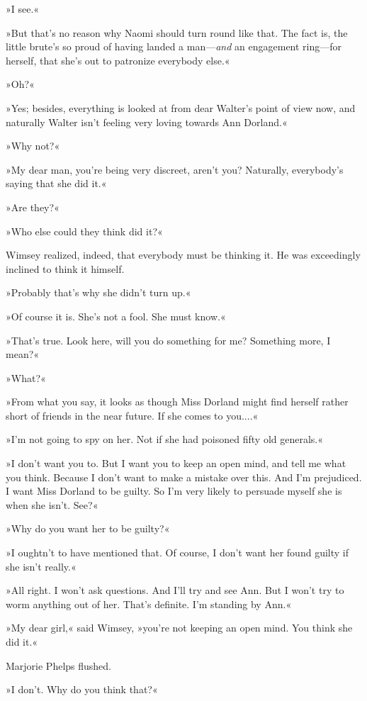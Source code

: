 »I see.«

»But that's no reason why Naomi should turn round like that. The fact is, the little brute's so proud of having landed a man—\textit{and} an engagement ring—for herself, that she's out to patronize everybody else.«

»Oh?«

»Yes; besides, everything is looked at from dear Walter's point of view now, and naturally Walter isn't feeling very loving towards Ann Dorland.«

»Why not?«

»My dear man, you're being very discreet, aren't you? Naturally, everybody's saying that she did it.«

»Are they?«

»Who else could they think did it?«

Wimsey realized, indeed, that everybody must be thinking it. He was exceedingly inclined to think it himself.

»Probably that's why she didn't turn up.«

»Of course it is. She's not a fool. She must know.«

»That's true. Look here, will you do something for me? Something more, I mean?«

»What?«

»From what you say, it looks as though Miss Dorland might find herself rather short of friends in the near future. If she comes to you....«

»I'm not going to spy on her. Not if she had poisoned fifty old generals.«

»I don't want you to. But I want you to keep an open mind, and tell me what you think. Because I don't want to make a mistake over this. And I'm prejudiced. I want Miss Dorland to be guilty. So I'm very likely to persuade myself she is when she isn't. See?«

»Why do you want her to be guilty?«

»I oughtn't to have mentioned that. Of course, I don't want her found guilty if she isn't really.«

»All right. I won't ask questions. And I'll try and see Ann. But I won't try to worm anything out of her. That's definite. I'm standing by Ann.«

»My dear girl,« said Wimsey, »you're not keeping an open mind. You think she did it.«

Marjorie Phelps flushed.

»I don't. Why do you think that?«

